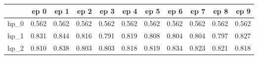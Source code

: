 \begin{tabular}{lrrrrrrrrrr}
\toprule
{} &   ep 0 &   ep 1 &   ep 2 &   ep 3 &   ep 4 &   ep 5 &   ep 6 &   ep 7 &   ep 8 &   ep 9 \\
\midrule
hp\_0 &  0.562 &  0.562 &  0.562 &  0.562 &  0.562 &  0.562 &  0.562 &  0.562 &  0.562 &  0.562 \\
hp\_1 &  0.831 &  0.844 &  0.816 &  0.791 &  0.819 &  0.808 &  0.804 &  0.804 &  0.797 &  0.827 \\
hp\_2 &  0.810 &  0.838 &  0.803 &  0.803 &  0.818 &  0.819 &  0.834 &  0.823 &  0.821 &  0.818 \\
\bottomrule
\end{tabular}
